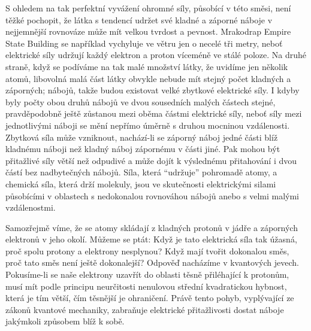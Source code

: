     S ohledem na tak perfektní vyvážení ohromné síly, působící v této směsi, není těžké pochopit, že 
    látka s tendencí udržet své kladné a záporné náboje v nejjemnější rovnováze může mít velkou 
    tvrdost a pevnost. Mrakodrap Empire State Building se například vychyluje ve větru jen o necelé 
    tři metry, neboť elektrické síly udržují každý elektron a proton víceméně ve stálé poloze. Na 
    druhé straně, když se podíváme na tak malé množství látky, že uvidíme jen několik atomů, 
    libovolná malá část látky obvykle nebude mít stejný počet kladných a záporných; nábojů, takže 
    budou existovat velké zbytkové elektrické síly. I kdyby byly počty obou druhů nábojů ve dvou 
    sousedních malých částech stejné, pravděpodobně ještě zůstanou mezi oběma částmi elektrické 
    síly, neboť síly mezi jednotlivými náboji se mění nepřímo úměrně s druhou mocninou vzdálenosti. 
    Zbytková síla může vzniknout, nachází-li se záporný náboj jedné části blíž kladnému náboji než 
    kladný náboj zápornému v části jiné. Pak mohou být přitažlivé síly větší než odpudivé a může 
    dojít k výslednému přitahování i dvou částí bez nadbytečných nábojů. Síla, která “udržuje” 
    pohromadě atomy, a chemická síla, která drží molekuly, jsou ve skutečnosti elektrickými 
    silami působícími v oblastech s nedokonalou rovnováhou nábojů anebo s velmi malými vzdálenostmi.
    
    Samozřejmě víme, že se atomy skládají z kladných protonů v jádře a záporných elektronů v jeho 
    okolí. Můžeme se ptát: Když je tato elektrická síla tak úžasná, proč spolu protony a elektrony 
    nesplynou? Když mají tvořit dokonalou směs, proč tato směs není ještě dokonalejší? Odpověď 
    nacházíme v kvantových jevech. Pokusíme-li se naše elektrony uzavřít do oblasti těsně 
    přiléhající k protonům, musí mít podle principu neurčitosti nenulovou střední kvadratickou 
    hybnost, která je tím větší, čím těsnější je ohraničení. Právě tento pohyb, vyplývající ze 
    zákonů kvantové mechaniky, zabraňuje elektrické přitažlivosti dostat náboje jakýmkoli způsobem 
    blíž k sobě.
    
